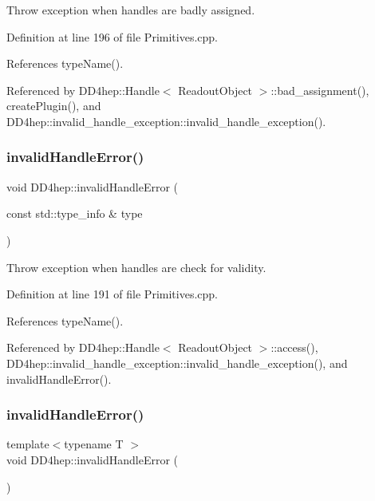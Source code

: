 Throw exception when handles are badly assigned. 



Definition at line 196 of file Primitives.\+cpp.



References type\+Name().



Referenced by D\+D4hep\+::\+Handle$<$ Readout\+Object $>$\+::bad\+\_\+assignment(), create\+Plugin(), and D\+D4hep\+::invalid\+\_\+handle\+\_\+exception\+::invalid\+\_\+handle\+\_\+exception().

\hypertarget{namespace_d_d4hep_abe634ec00c4fc9e3a5e722ad0865d848}{}\label{namespace_d_d4hep_abe634ec00c4fc9e3a5e722ad0865d848} 
\subsubsection{\texorpdfstring{invalid\+Handle\+Error()}{invalidHandleError()}\hspace{0.1cm}{\footnotesize\ttfamily [1/2]}}
{\footnotesize\ttfamily void D\+D4hep\+::invalid\+Handle\+Error (\begin{DoxyParamCaption}\item[{const std\+::type\+\_\+info \&}]{type }\end{DoxyParamCaption})}



Throw exception when handles are check for validity. 



Definition at line 191 of file Primitives.\+cpp.



References type\+Name().



Referenced by D\+D4hep\+::\+Handle$<$ Readout\+Object $>$\+::access(), D\+D4hep\+::invalid\+\_\+handle\+\_\+exception\+::invalid\+\_\+handle\+\_\+exception(), and invalid\+Handle\+Error().

\hypertarget{namespace_d_d4hep_ac1ec54d96148f5c3e8150944ba390d34}{}\label{namespace_d_d4hep_ac1ec54d96148f5c3e8150944ba390d34} 
\subsubsection{\texorpdfstring{invalid\+Handle\+Error()}{invalidHandleError()}\hspace{0.1cm}{\footnotesize\ttfamily [2/2]}}
{\footnotesize\ttfamily template$<$typename T $>$ \\
void D\+D4hep\+::invalid\+Handle\+Error (\begin{DoxyParamCaption}{ }\end{DoxyParamCaption})}



